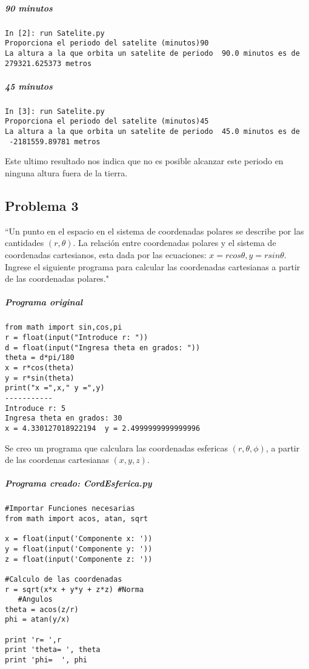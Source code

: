 \documentclass[12pt]{article}
\begin{document}
\subparagraph*{90 minutos}
\begin{verbatim}
In [2]: run Satelite.py
Proporciona el periodo del satelite (minutos)90
La altura a la que orbita un satelite de periodo  90.0 minutos es de  279321.625373 metros
\end{verbatim}

\subparagraph*{45 minutos}
\begin{verbatim}
In [3]: run Satelite.py
Proporciona el periodo del satelite (minutos)45
La altura a la que orbita un satelite de periodo  45.0 minutos es de 
 -2181559.89781 metros

\end{verbatim}
Este ultimo resultado nos indica que no es posible alcanzar este periodo en ninguna altura fuera de la tierra.

\subsection{Problema 3}
``Un punto en el espacio en el sistema de coordenadas polares se describe por las cantidades $(r, \theta)$. La relación entre coordenadas polares y el sistema de coordenadas cartesianos, esta dada por las ecuaciones:  $x = r cos{\theta}, y = r sin{\theta}$. Ingrese el siguiente programa para calcular las coordenadas cartesianas a partir de las coordenadas polares."\cite{act}

\subparagraph*{Programa original}
\begin{verbatim}
from math import sin,cos,pi
r = float(input("Introduce r: "))
d = float(input("Ingresa theta en grados: "))
theta = d*pi/180
x = r*cos(theta)
y = r*sin(theta)
print("x =",x," y =",y)
-----------
Introduce r: 5
Ingresa theta en grados: 30
x = 4.330127018922194  y = 2.4999999999999996
\end{verbatim}

Se creo un programa que calculara las coordenadas esfericas $(r,\theta, \phi)$, a partir de las coordenas cartesianas $(x,y,z)$.

\newpage
\subparagraph*{Programa creado: CordEsferica.py}\cite{CorWiki}

\begin{verbatim}
#Importar Funciones necesarias
from math import acos, atan, sqrt

x = float(input('Componente x: '))
y = float(input('Componente y: '))
z = float(input('Componente z: '))

#Calculo de las coordenadas
r = sqrt(x*x + y*y + z*z) #Norma
   #Angulos
theta = acos(z/r)
phi = atan(y/x)

print 'r= ',r 
print 'theta= ', theta
print 'phi=  ', phi 
\end{verbatim}
\end{document}
